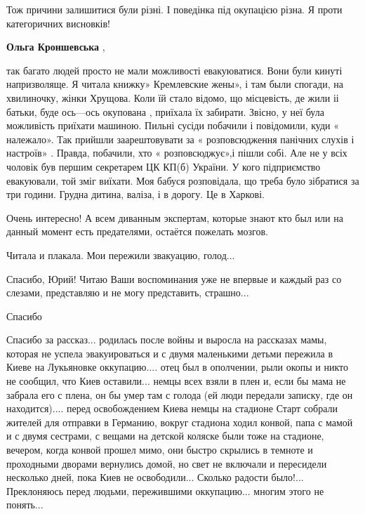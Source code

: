 \begin{itemize}
Тож причини залишитися були різні. І поведінка під окупацією різна. Я проти
категоричних висновків!

\begin{itemize} %
\textbf{Ольга Кроншевська} , 

так багато людей просто не мали можливості евакуюватися. Вони були кинуті
напризволяще. Я читала книжку» Кремлевские жены», і там были спогади, на
хвилиночку, жінки Хрущова. Коли їй стало відомо, що місцевість, де жили іі
батьки, буде ось—ось окупована , приїхала їх забирати. Звісно, у неї була
можливість приїхати машиною. Пильні сусіди побачили і повідомили, куди «
належало». Так прийшли заарештовувати за « розповсюдження панічних слухів і
настроїв» . Правда, побачили, хто « розповсюджує»,і пішли собі. Але не у всіх
чоловік був першим секретарем ЦК КП(б) України. У кого підприємство евакуювали,
той зміг виїхати. Моя бабуся розповідала, що треба було зібратися за три
години. Грудна дитина, валіза, і в дорогу. Це в Харкові.

\end{itemize} %

Очень интересно!
А всем диванным экспертам, которые знают кто был или на данный момент есть предателями, остаётся пожелать мозгов.

Читала и плакала. Мои пережили звакуацию, голод...

Спасибо, Юрий! Читаю Ваши воспоминания уже не впервые и каждый раз со слезами, представляю и не могу представить, страшно...

Спасибо


Спасибо за рассказ... родилась после войны и выросла на рассказах мамы, которая
не успела эвакуироваться и с двумя маленькими детьми пережила в Киеве на
Лукьяновке оккупацию.... отец был в ополчении, рыли окопы и никто не сообщил, что
Киев оставили... немцы всех взяли в плен и, если бы мама не забрала его с
плена, он бы умер там с голода (ей люди передали записку, где он
находится).... перед освобождением Киева немцы на стадионе Старт собрали жителей
для отправки в Германию, вокруг стадиона ходил конвой, папа с мамой и с двумя
сестрами, с вещами на детской коляске были тоже на стадионе, вечером, когда конвой
прошел мимо, они быстро скрылись в темноте и проходными дворами вернулись
домой, но свет не включали и пересидели несколько дней, пока Киев не
освободили... Сколько радости было!... Преклоняюсь перед людьми, пережившими
оккупацию... многим этого не понять...

\end{itemize} %
